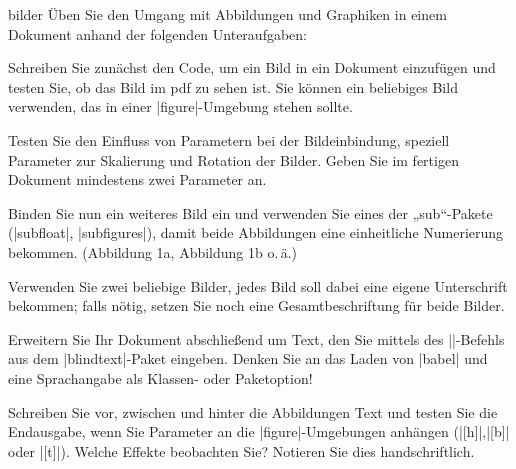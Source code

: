 \documentclass[
	blatt=7,
	ausgabe=28.\,05.\,2010,
	rückgabe=03.\,06.\,2010
]{lcourse-hd}
\begin{document}
\begin{exercise}[
  name={Abbildungen},
  punkte=7,
  abgabe = Quellcode per Mail und Quellcode ausgedruckt. Fertiges Dokument (pdf) per Mail. Beobachtungen zu den Parametern handschriftlich.]{bilder}
Üben Sie den Umgang mit Abbildungen und Graphiken in einem Dokument anhand der folgenden Unteraufgaben:

Schreiben Sie zunächst den Code, um ein Bild in ein Dokument einzufügen und testen Sie, ob das Bild im pdf zu sehen ist. Sie können ein beliebiges Bild verwenden, das in einer |figure|-Umgebung stehen sollte.

Testen Sie den Einfluss von Parametern bei der Bildeinbindung, speziell Parameter zur Skalierung und Rotation der Bilder. Geben Sie im fertigen Dokument mindestens zwei Parameter an.

Binden Sie nun ein weiteres Bild ein und verwenden Sie eines der „sub“-Pakete (|subfloat|, |subfigures|), damit beide Abbildungen eine einheitliche Numerierung bekommen. (Abbildung 1a, Abbildung 1b o.\,ä.)

Verwenden Sie zwei beliebige Bilder, jedes Bild soll dabei eine eigene Unterschrift bekommen; falls nötig, setzen Sie noch eine Gesamtbeschriftung für beide Bilder.

Erweitern Sie Ihr Dokument abschließend um Text, den Sie mittels des |\blindtext|-Befehls aus dem |blindtext|-Paket eingeben. Denken Sie an das Laden von |babel| und eine Sprachangabe als Klassen- oder Paketoption!

Schreiben Sie vor, zwischen und hinter die Abbildungen Text und testen Sie die Endausgabe, wenn Sie Parameter an die |figure|-Umgebungen anhängen (|[h]|,|[b]| oder |[t]|). Welche Effekte beobachten Sie? Notieren Sie dies handschriftlich.

\end{exercise}
\end{document}

